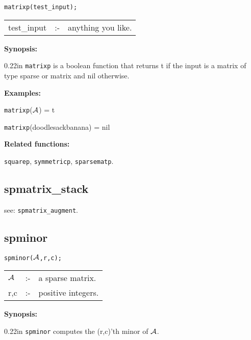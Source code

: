 
\hspace*{0.175in} {\tt matrixp(test\_input);}

\hspace*{0.1in}  
\begin{tabular}{l l l}
test\_input &:-& anything you like.
\end{tabular}

{\bf Synopsis:} %

\begin{addtolength}{\leftskip}{0.22in}
{\tt matrixp} is a boolean function that returns t if 
                the input is a matrix of type sparse or matrix and nil otherwise.

\end{addtolength}

{\bf Examples:}

\hspace*{0.175in} {\tt matrixp}(${\cal A}$) = t 

\hspace*{0.175in} {\tt matrixp}(doodlesackbanana) = nil

{\bf Related functions:}

\hspace*{0.175in} {\tt squarep}, {\tt symmetricp}, {\tt sparsematp}.


\subsection{spmatrix\_stack}

\hspace*{0.175in} see: {\tt spmatrix\_augment}.


\subsection{spminor}

\hspace*{0.175in} {\tt spminor(${\cal A}$,r,c);}

\hspace*{0.1in}  
\begin{tabular}{l l l} 
${\cal A}$ &:-& a sparse matrix. \\
r,c        &:-& positive integers.
\end{tabular}

{\bf Synopsis:}

\begin{addtolength}{\leftskip}{0.22in}
                {\tt spminor} computes the (r,c)'th minor of ${\cal A}$.
 
\end{addtolength}
                
